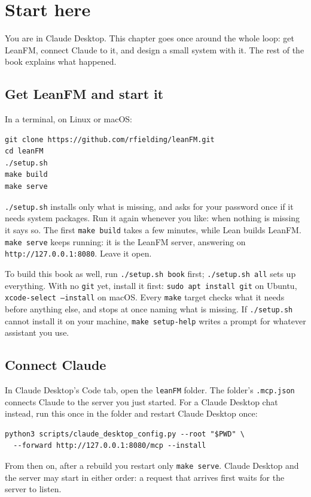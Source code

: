 \chapter{Start here}\label{ch:start}

You are in Claude Desktop. This chapter goes once around the whole loop: get LeanFM, connect
Claude to it, and design a small system with it. The rest of the book explains what happened.

\section{Get LeanFM and start it}

In a terminal, on Linux or macOS:
\begin{lstlisting}[language={},basicstyle=\ttfamily\footnotesize]
git clone https://github.com/rfielding/leanFM.git
cd leanFM
./setup.sh
make build
make serve
\end{lstlisting}
\texttt{./setup.sh} installs only what is missing, and asks for your password once if it needs
system packages. Run it again whenever you like: when nothing is missing it says so. The first
\texttt{make build} takes a few minutes, while Lean builds LeanFM. \texttt{make serve} keeps
running: it is the LeanFM server, answering on \texttt{http://127.0.0.1:8080}. Leave it open.

To build this book as well, run \texttt{./setup.sh book} first; \texttt{./setup.sh all} sets up
everything. With no \texttt{git} yet, install it first: \texttt{sudo apt install git} on Ubuntu,
\texttt{xcode-select --install} on macOS. Every \texttt{make} target checks what it needs before
anything else, and stops at once naming what is missing. If \texttt{./setup.sh} cannot install it on
your machine, \texttt{make setup-help} writes a prompt for whatever assistant you use.

\section{Connect Claude}

In Claude Desktop's Code tab, open the \texttt{leanFM} folder. The folder's
\texttt{.mcp.json} connects Claude to the server you just started. For a Claude Desktop chat
instead, run this once in the folder and restart Claude Desktop once:
\begin{lstlisting}[language={},basicstyle=\ttfamily\footnotesize]
python3 scripts/claude_desktop_config.py --root "$PWD" \
  --forward http://127.0.0.1:8080/mcp --install
\end{lstlisting}
From then on, after a rebuild you restart only \texttt{make serve}. Claude Desktop and the
server may start in either order: a request that arrives first waits for the server to listen.

